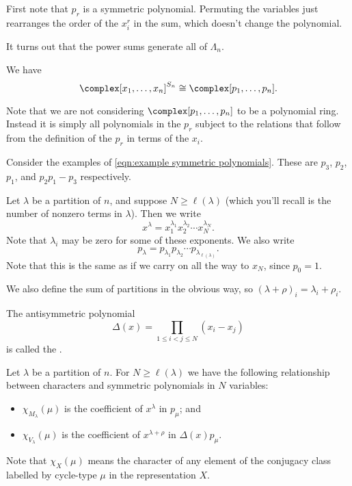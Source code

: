 First note that \(p_r\) is a symmetric polynomial.
Permuting the variables just rearranges the order of the \(x_i^r\) in the sum, which doesn't change the polynomial.

It turns out that the power sums generate all of \(\Lambda_n\).

\begin{prp}{}{}
    We have
    \begin{equation}
        \complex[x_1, \dotsc, x_n]^{S_n} \isomorphic \complex[p_1, \dotsc, p_n].
    \end{equation}
\end{prp}

Note that we are not considering \(\complex[p_1, \dotsc, p_n]\) to be a polynomial ring.
Instead it is simply all polynomials in the \(p_r\) subject to the relations that follow from the definition of the \(p_r\) in terms of the \(x_i\).

Consider the examples of \cref{eqn:example symmetric polynomials}.
These are \(p_3\), \(p_2\), \(p_1\), and \(p_2p_1 - p_3\) respectively.

\begin{ntn}{}{}
    Let \(\lambda\) be a partition of \(n\), and suppose \(N \ge \ell(\lambda)\) (which you'll recall is the number of nonzero terms in \(\lambda\)).
    Then we write
    \begin{equation}
        x^\lambda = x_1^{\lambda_1} x_2^{\lambda_2} \dotsm x_N^{\lambda_N}.
    \end{equation}
    Note that \(\lambda_i\) may be zero for some of these exponents.
    We also write
    \begin{equation}
        p_{\lambda} = p_{\lambda_1} p_{\lambda_2} \dotsm p_{\lambda_{\ell(\lambda)}}.
    \end{equation}
    Note that this is the same as if we carry on all the way to \(x_N\), since \(p_0 = 1\).
    
    We also define the sum of partitions in the obvious way, so \((\lambda + \rho)_i = \lambda_i + \rho_i\).
    
    The antisymmetric polynomial
    \begin{equation}
        \Delta(x) = \prod_{1 \le i < j \le N} (x_i - x_j)
    \end{equation} 
    is called the .
\end{ntn}

\begin{prp}{}{}
    Let \(\lambda\) be a partition of \(n\).
    For \(N \ge \ell(\lambda)\) we have the following relationship between characters and symmetric polynomials in \(N\) variables:
    \begin{itemize}
        \item \(\chi_{M_\lambda}(\mu)\) is the coefficient of \(x^\lambda\) in \(p_\mu\); and
        \item \(\chi_{V_\lambda}(\mu)\) is the coefficient of \(x^{\lambda + \rho}\) in \(\Delta(x)p_\mu\).
    \end{itemize}
    Note that \(\chi_{X}(\mu)\) means the character of any element of the conjugacy class labelled by cycle-type \(\mu\) in the representation \(X\).
\end{prp}

